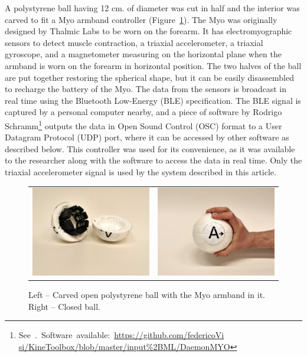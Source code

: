 \documentclass{nime-alternate_MANUSCRIPT} %
\begin{document}
A polystyrene ball having 12 cm. of diameter was cut in half and the interior was carved to fit a Myo armband controller (Figure~\ref{fig_2}). The Myo was originally designed by Thalmic Labs to be worn on the forearm. It has electromyographic sensors to detect muscle contraction, a triaxial accelerometer, a triaxial gyroscope, and a magnetometer measuring on the horizontal plane when the armband is worn on the forearm in horizontal position. The two halves of the ball are put together restoring the spherical shape, but it can be easily disassembled to recharge the battery of the Myo. The data from the sensors is broadcast in real time using the Bluetooth Low-Energy (BLE) specification. The BLE signal is captured by a personal computer nearby, and a piece of software by Rodrigo Schramm\footnote{See~\cite{Visi_2017}.~Software~available:~\href{https://github.com/federicoVisi/KineToolbox/blob/master/input\%2BML/DaemonMYO}{https://github.com/federicoVi\\si/KineToolbox/blob/master/input\%2BML/DaemonMYO}} outputs the data in Open Sound Control (OSC) format to a User Datagram Protocol (UDP) port, where it can be accessed by other software as described below. This controller was used for its convenience, as it was available to the researcher along with the software to access the data in real time. Only the triaxial accelerometer signal is used by the system described in this article.

\begin{figure}[t!]
   \setlength\tabcolsep{2pt} 
    \begin{tabular}{cc}
        \includegraphics[trim={10cm 24cm 10cm 6cm}, clip=true, width=0.48\columnwidth]{ball_open}
        &
        \includegraphics[trim={20cm 15cm 0cm 15cm}, clip=true, width=0.48\columnwidth]{ball_handheld}
    \end{tabular}
	\caption{Left -- Carved open polystyrene ball with the Myo armband in it. Right -- Closed ball.}
	\label{fig_2}
\vspace{0.6cm}
\end{figure}
\end{document}
